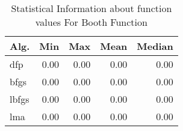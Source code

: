 \begin{table}[H]
\centering
\caption{Statistical Information about function values For Booth Function}
\label{function_values:booth}
\begin{tabular}{lrrrr}
\toprule
 Alg. &  Min &  Max &  Mean &  Median \\
\midrule
  dfp & 0.00 & 0.00 &  0.00 &    0.00 \\
 bfgs & 0.00 & 0.00 &  0.00 &    0.00 \\
lbfgs & 0.00 & 0.00 &  0.00 &    0.00 \\
  lma & 0.00 & 0.00 &  0.00 &    0.00 \\
\bottomrule
\end{tabular}
\end{table}
